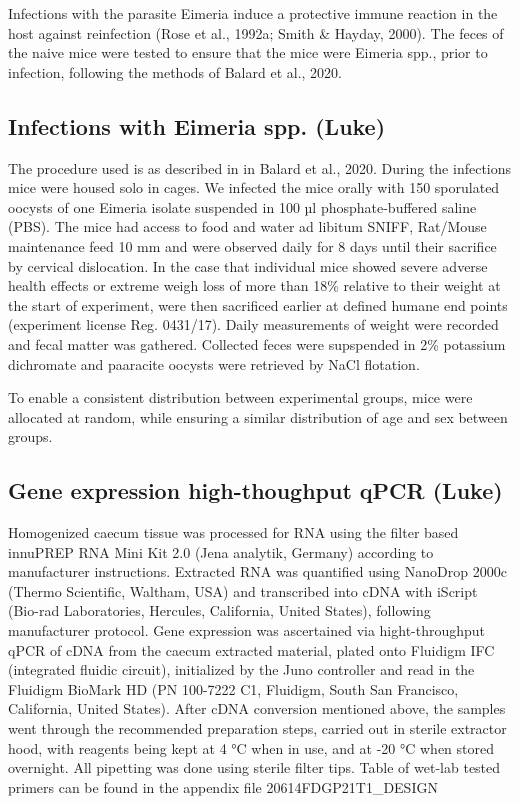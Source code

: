 \documentclass[webpdf,large,contemporary,namedate]{oup-authoring-template}
\theoremstyle{thmstyleone}
\theoremstyle{thmstyletwo}
\theoremstyle{thmstylethree}
\begin{document}
Infections with the parasite Eimeria induce a protective immune reaction
in the host against reinfection (Rose et al., 1992a; Smith \& Hayday,
2000). The feces of the naive mice were tested to ensure that the mice
were Eimeria spp., prior to infection, following the methods of Balard
et al., 2020.

\hypertarget{infections-with-eimeria-spp.-luke}{%
\subsection{Infections with Eimeria spp.
(Luke)}\label{infections-with-eimeria-spp.-luke}}

The procedure used is as described in in Balard et al., 2020. During the
infections mice were housed solo in cages. We infected the mice orally
with 150 sporulated oocysts of one Eimeria isolate suspended in 100 µl
phosphate-buffered saline (PBS). The mice had access to food and water
ad libitum SNIFF, Rat/Mouse maintenance feed 10 mm and were observed
daily for 8 days until their sacrifice by cervical dislocation. In the
case that individual mice showed severe adverse health effects or
extreme weigh loss of more than 18\% relative to their weight at the
start of experiment, were then sacrificed earlier at defined humane end
points (experiment license Reg. 0431/17). Daily measurements of weight
were recorded and fecal matter was gathered. Collected feces were
supspended in 2\% potassium dichromate and paaracite oocysts were
retrieved by NaCl flotation.

To enable a consistent distribution between experimental groups, mice
were allocated at random, while ensuring a similar distribution of age
and sex between groups.

\hypertarget{gene-expression-high-thoughput-qpcr-luke}{%
\subsection{Gene expression high-thoughput qPCR
(Luke)}\label{gene-expression-high-thoughput-qpcr-luke}}

Homogenized caecum tissue was processed for RNA using the filter based
innuPREP RNA Mini Kit 2.0 (Jena analytik, Germany) according to
manufacturer instructions. Extracted RNA was quantified using NanoDrop
2000c (Thermo Scientific, Waltham, USA) and transcribed into cDNA with
iScript (Bio-rad Laboratories, Hercules, California, United States),
following manufacturer protocol. Gene expression was ascertained via
hight-throughput qPCR of cDNA from the caecum extracted material, plated
onto Fluidigm IFC (integrated fluidic circuit), initialized by the Juno
controller and read in the Fluidigm BioMark HD (PN 100-7222 C1,
Fluidigm, South San Francisco, California, United States). After cDNA
conversion mentioned above, the samples went through the recommended
preparation steps, carried out in sterile extractor hood, with reagents
being kept at 4 °C when in use, and at -20 °C when stored overnight. All
pipetting was done using sterile filter tips. Table of wet-lab tested
primers can be found in the appendix file 20614FDGP21T1\_DESIGN
\end{document}
